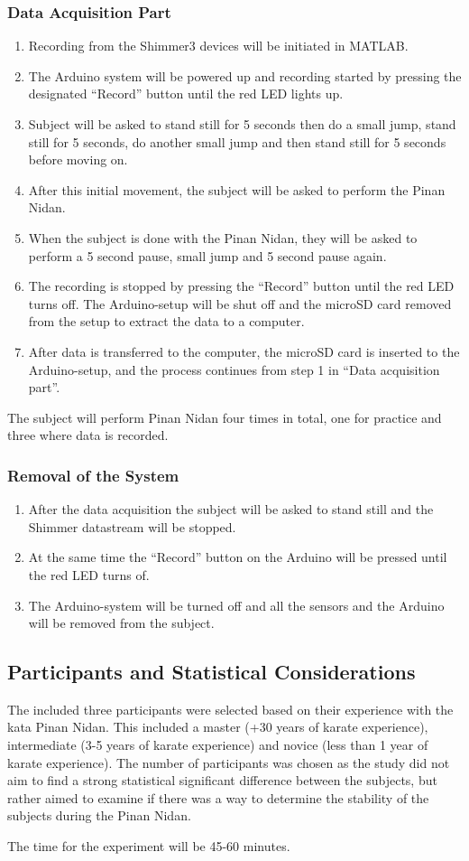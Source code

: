 \subsubsection{Data Acquisition Part}
\begin{enumerate}
\item Recording from the Shimmer3 devices will be initiated in MATLAB.
\item The Arduino system will be powered up and recording started by pressing the designated “Record” button until the red LED lights up.
\item Subject will be asked to stand still for 5 seconds then do a small jump, stand still for 5 seconds, do another small jump and then stand still for 5 seconds before moving on.
\item After this initial movement, the subject will be asked to perform the Pinan Nidan.
\item When the subject is done with the Pinan Nidan, they will be asked to perform a 5 second pause, small jump and 5 second pause again.
\item The recording is stopped by pressing the “Record” button until the red LED turns off. The Arduino-setup will be shut off and the microSD card removed from the setup to extract the data to a computer.
\item After data is transferred to the computer, the microSD card is inserted to the Arduino-setup, and the process continues from step 1 in “Data acquisition part”.
\end{enumerate}

The subject will perform Pinan Nidan four times in total, one for practice and three where data is recorded.

\subsubsection{Removal of the System}
\begin{enumerate}
\item After the data acquisition the subject will be asked to stand still and the Shimmer datastream will be stopped. 
\item At the same time the “Record” button on the Arduino will be pressed until the red LED turns of. 
\item The Arduino-system will be turned off and all the sensors and the Arduino will be removed from the subject.
\end{enumerate}

\subsection{Participants and Statistical Considerations}
The included three participants were selected based on their experience with the kata Pinan Nidan. This included a master (+30 years of karate experience), intermediate (3-5 years of karate experience) and novice (less than 1 year of karate experience). The number of participants was chosen as the study did not aim to find a strong statistical significant difference between the subjects, but rather aimed to examine if there was a way to determine the stability of the subjects during the Pinan Nidan.

The time for the experiment will be 45-60 minutes.
